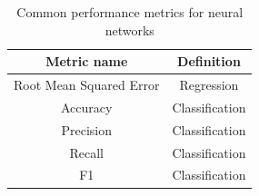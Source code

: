 \documentclass[journal]{IEEEtran}
\begin{document}


%
%
%





\clearpage


\onecolumn%
\begin{table}[!htb]
\begin{center}
\begin{tabular}{| c | c |}
\hline
Metric name & Definition\\
\hline
Root Mean Squared Error & Regression \\
Accuracy & Classification \\
Precision & Classification \\
Recall & Classification \\
F1 & Classification \\
\hline
\end{tabular}
\end{center}
\caption{Common performance metrics for neural networks}
\label{table:performance_metrics}
\end{table}
\end{document}
